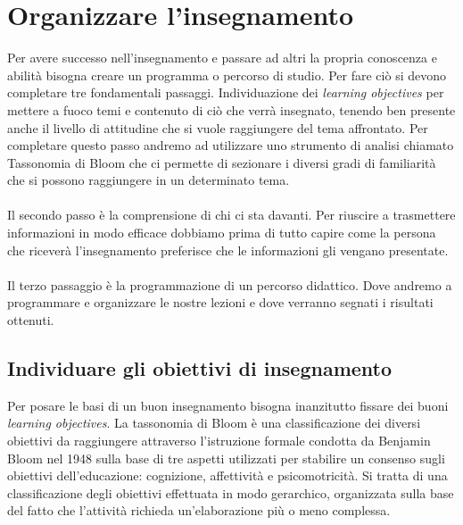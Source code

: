 \chapter{Organizzare l'insegnamento}
\label{cha:intro}
Per avere successo nell'insegnamento e passare ad altri la propria conoscenza e abilità bisogna creare un programma o percorso di studio. Per fare ciò si devono completare tre fondamentali passaggi.
Individuazione dei \textit{learning objectives} per mettere a fuoco temi e contenuto di ciò che verrà insegnato, tenendo ben presente anche il livello di attitudine che si vuole raggiungere del tema affrontato. Per completare questo passo andremo ad utilizzare uno strumento di analisi chiamato Tassonomia di Bloom che ci permette di sezionare i diversi gradi di familiarità che si possono raggiungere in un determinato tema.\\
\\
Il secondo passo è la comprensione di chi ci sta davanti. Per riuscire a trasmettere informazioni in modo efficace dobbiamo prima di tutto capire come la persona che riceverà l'insegnamento preferisce che le informazioni gli vengano presentate.\\
\\
Il terzo passaggio è la programmazione di un percorso didattico. Dove andremo a programmare e organizzare le nostre lezioni e dove verranno segnati i risultati ottenuti.\\
\section{Individuare gli obiettivi di insegnamento}
\label{sec:context}
Per posare le basi di un buon insegnamento bisogna inanzitutto fissare dei buoni \textit{learning objectives}.
La tassonomia di Bloom è una classificazione dei diversi obiettivi da raggiungere attraverso l'istruzione formale condotta da Benjamin Bloom nel 1948 sulla base di tre aspetti utilizzati per stabilire un consenso sugli obiettivi dell'educazione: cognizione, affettività e psicomotricità. Si tratta di una classificazione degli obiettivi effettuata in modo gerarchico, organizzata sulla base del fatto che l'attività richieda un'elaborazione più o meno complessa.


